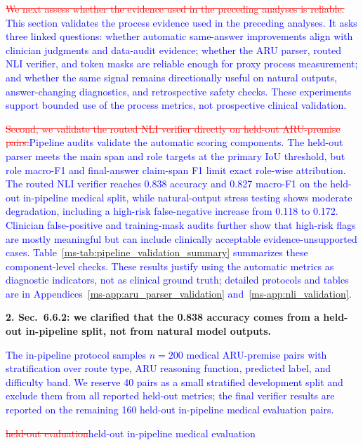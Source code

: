 \documentclass[12pt]{article}
\newcommand{\deleted}[1]{\textcolor{red}{\sout{#1}}}
\newcommand{\added}[1]{\textcolor{blue}{#1}}
\begin{document}
\begin{displayquote}
\deleted{We next assess whether the evidence used in the preceding analyses is reliable.}
\added{This section validates the process evidence used in the preceding analyses. It asks three linked questions: whether automatic same-answer improvements align with clinician judgments and data-audit evidence; whether the ARU parser, routed NLI verifier, and token masks are reliable enough for proxy process measurement; and whether the same signal remains directionally useful on natural outputs, answer-changing diagnostics, and retrospective safety checks. These experiments support bounded use of the process metrics, not prospective clinical validation.}

\deleted{Second, we validate the routed NLI verifier directly on held-out ARU-premise
pairs.}\added{Pipeline audits validate the automatic scoring components. The held-out parser meets the main span and role targets at the primary IoU threshold, but role macro-F1 and final-answer claim-span F1 limit exact role-wise attribution. The routed NLI verifier reaches 0.838 accuracy and 0.827 macro-F1 on the held-out in-pipeline medical split, while natural-output stress testing shows moderate degradation, including a high-risk false-negative increase from 0.118 to 0.172. Clinician false-positive and training-mask audits further show that high-risk flags are mostly meaningful but can include clinically acceptable evidence-unsupported cases. Table~\ref*{ms-tab:pipeline_validation_summary} summarizes these component-level checks. These results justify using the automatic metrics as diagnostic indicators, not as clinical ground truth; detailed protocols and tables are in Appendices~\ref*{ms-app:aru_parser_validation} and~\ref*{ms-app:nli_validation}.}
\end{displayquote}

\textbf{2. Sec.~6.6.2: we clarified that the 0.838 accuracy comes from a held-out
in-pipeline split, not from natural model outputs.}

\begin{displayquote}
\added{The in-pipeline protocol samples $n=200$ medical ARU-premise pairs with stratification over route type, ARU reasoning function, predicted label, and difficulty band. We reserve 40 pairs as a small stratified development split and exclude them from all reported held-out metrics; the final verifier results are reported on the remaining 160 held-out in-pipeline medical evaluation pairs.}

\deleted{held-out evaluation}\added{held-out in-pipeline medical evaluation}
\end{displayquote}
\end{document}
